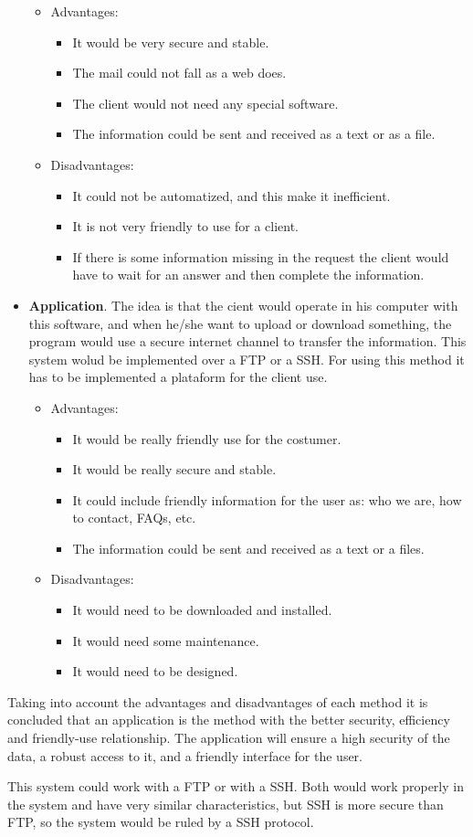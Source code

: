\begin{itemize}
\begin{itemize}
\item Advantages:
\begin{itemize}
\item It would be very secure and stable.
\item The mail could not fall as a web does.
\item The client would not need any special software.
\item The information could be sent and received as a text or as a file.
\end{itemize}
\item Disadvantages: 
\begin{itemize}
\item It could not be automatized, and this make it inefficient.
\item It is not very friendly to use for a client.
\item If there is some information missing in the request the client would have to wait for an answer and then complete the information. 
\end{itemize}
\end{itemize}
\item \textbf{Application}.  The idea is that the cient would operate in his computer with this software, and when he/she want to upload or download something, the program would use a secure internet channel to transfer the information. This system wolud be implemented over a FTP or a SSH. For using this method it has to be implemented a plataform for the client use.
\begin{itemize}
\item Advantages:
\begin{itemize}
\item It would be really friendly use for the costumer.
\item It would be really secure and stable.
\item It could include friendly information for the user as: who we are, how to contact, FAQs, etc.
\item The information could be sent and received as a text or a files.
\end{itemize}
\item Disadvantages:
\begin{itemize}
\item It would need to be downloaded and installed.
\item It would need some maintenance.
\item It would need to be designed.
\end{itemize}
\end{itemize}
\end{itemize}

Taking into account the advantages and disadvantages of each method it is concluded that an application is the method with the better security, efficiency and friendly-use relationship. The application will ensure a high security of the data, a robust access to it, and a friendly interface for the user.

This system could work with a FTP or with a SSH. Both would work properly in the system and have very similar characteristics, but SSH is more secure than FTP, so the system would be ruled by a SSH protocol.